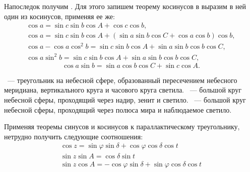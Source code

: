 	Напоследок получим . Для этого запишем теорему косинусов в выразим в ней один из косинусов, применяя ее же:
	\begin{gather*}
		\cos a = \sin c \sin b \cos A + \cos c \cos b,\\
		\cos a = \sin c \sin b \cos A + \left( \sin a \sin b \cos C + \cos a \cos b \right)\cos b,\\
		\cos a - \cos a \cos^2 b = \sin c \sin b \cos A + \sin a \sin b \cos b \cos C,\\
		\cos a \sin^2 b = \sin c \sin b \cos A + \sin a \sin b \cos b \cos C,
	\end{gather*}
	\begin{equation}
		\cos a \sin b = \sin a \cos b \cos C + \sin c \cos A.
	\end{equation}

~--- треугольник на небесной  сфере, образованный пересечением небесного меридиана, вертикального круга и часового круга светила. ~--- большой круг небесной сферы, проходящий через надир, зенит и светило. ~--- большой круг небесной сферы, проходящий через полюса мира и наблюдаемое светило.

Применяя теоремы синусов и косинусов к параллактическому треугольнику, нетрудно получить следующие соотношения:
\begin{gather}
\cos z=\sin\varphi\sin\delta+\cos\varphi\cos\delta\cos t\\
\sin z\sin A=\cos\delta\sin t\\
\sin z\cos A=-\cos\varphi\sin\delta+\sin\varphi\cos\delta\cos t
\end{gather}